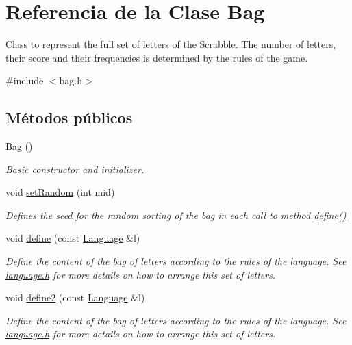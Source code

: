 \hypertarget{classBag}{}\section{Referencia de la Clase Bag}
\label{classBag}


Class to represent the full set of letters of the Scrabble. The number of letters, their score and their frequencies is determined by the rules of the game.  




{\ttfamily \#include $<$bag.\+h$>$}

\subsection*{Métodos públicos}
\begin{DoxyCompactItemize}
\item 
\mbox{\label{classBag_ae0593c22c7dd8b32cab469af92fb200c}} 
\hyperlink{classBag_ae0593c22c7dd8b32cab469af92fb200c}{Bag} ()
\begin{DoxyCompactList}\small\item\em Basic constructor and initializer. \end{DoxyCompactList}\item 
void \hyperlink{classBag_a538b0c6342a97b45d034f41aa6a7749b}{set\+Random} (int mid)
\begin{DoxyCompactList}\small\item\em Defines the seed for the random sorting of the bag in each call to method \hyperlink{classBag_ad380d36f2628b3ffe0ca19cfe53d7c19}{define()} \end{DoxyCompactList}\item 
void \hyperlink{classBag_ad380d36f2628b3ffe0ca19cfe53d7c19}{define} (const \hyperlink{classLanguage}{Language} \&l)
\begin{DoxyCompactList}\small\item\em Define the content of the bag of letters according to the rules of the language. See \hyperlink{language_8h}{language.\+h} for more details on how to arrange this set of letters. \end{DoxyCompactList}\item 
void \hyperlink{classBag_a663748c811e0d45cebfa8ac13a1d9168}{define2} (const \hyperlink{classLanguage}{Language} \&l)
\begin{DoxyCompactList}\small\item\em Define the content of the bag of letters according to the rules of the language. See \hyperlink{language_8h}{language.\+h} for more details on how to arrange this set of letters. \end{DoxyCompactList}\item 

\end{DoxyCompactItemize}
